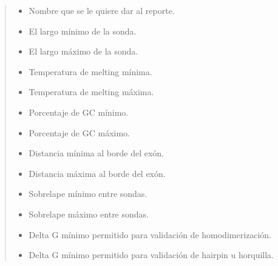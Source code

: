 \documentclass[letterpaper,10pt,spanish]{sphinxmanual}
\begin{document}
\begin{fulllineitems}
\begin{quote}
\begin{description}
\begin{itemize}
\item {} 
\sphinxAtStartPar
{} \textendash{} Nombre que se le quiere dar al reporte.

\item {} 
\sphinxAtStartPar
{} \textendash{} El largo mínimo de la sonda.

\item {} 
\sphinxAtStartPar
{} \textendash{} El largo máximo de la sonda.

\item {} 
\sphinxAtStartPar
{} \textendash{} Temperatura de melting mínima.

\item {} 
\sphinxAtStartPar
{} \textendash{} Temperatura de melting máxima.

\item {} 
\sphinxAtStartPar
{} \textendash{} Porcentaje de GC mínimo.

\item {} 
\sphinxAtStartPar
{} \textendash{} Porcentaje de GC máximo.

\item {} 
\sphinxAtStartPar
{} \textendash{} Distancia mínima al borde del exón.

\item {} 
\sphinxAtStartPar
{} \textendash{} Distancia máxima al borde del exón.

\item {} 
\sphinxAtStartPar
{} \textendash{} Sobrelape mínimo entre sondas.

\item {} 
\sphinxAtStartPar
{} \textendash{} Sobrelape máximo entre sondas.

\item {} 
\sphinxAtStartPar
{} \textendash{} Delta G mínimo permitido para validación de homodimerización.

\item {} 
\sphinxAtStartPar
{} \textendash{} Delta G mínimo permitido para validación de hairpin u horquilla.


\end{itemize}
\end{description}
\end{quote}
\end{fulllineitems}
\end{document}
